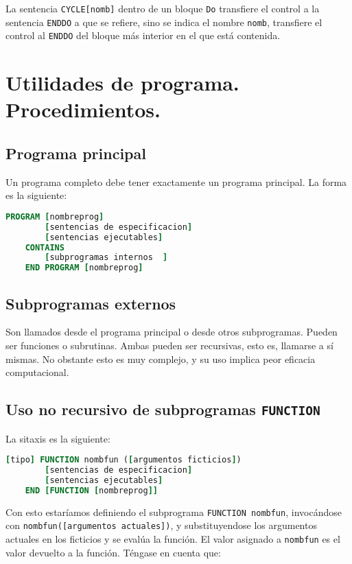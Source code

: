 La sentencia {\tt CYCLE[nomb]} dentro de un bloque {\tt Do} transfiere el control a la sentencia {\tt ENDDO} a que se refiere, sino se indica el nombre {\tt nomb}, transfiere el control al {\tt ENDDO} del bloque más interior en el que está contenida. 


\section{Utilidades de programa. Procedimientos.}

\subsection{Programa principal}

Un programa completo debe tener exactamente un programa principal. La forma es la siguiente:

\begin{lstlisting}[language=Fortran]
	PROGRAM [nombreprog]
		[sentencias de especificacion]
		[sentencias ejecutables]
	CONTAINS
		[subprogramas internos	]
	END PROGRAM [nombreprog]	
\end{lstlisting}

\subsection{Subprogramas externos}

Son llamados desde el programa principal o desde otros subprogramas. Pueden ser funciones o subrutinas. Ambas pueden ser recursivas, esto es, llamarse a sí mismas. No obstante esto es muy complejo, y su uso implica peor eficacia computacional. 

\subsection{Uso no recursivo de subprogramas {\tt FUNCTION}}

La sitaxis es la siguiente:

\begin{lstlisting}[language=Fortran]
	[tipo] FUNCTION nombfun ([argumentos ficticios])
		[sentencias de especificacion]
		[sentencias ejecutables]
	END [FUNCTION [nombreprog]]
\end{lstlisting}

Con esto estaríamos definiendo el subprograma {\tt FUNCTION nombfun}, invocándose con {\tt nombfun([argumentos actuales])}, y substituyendose los argumentos actuales en los ficticios y se evalúa la función. El valor asignado a {\tt nombfun} es el valor devuelto a la función. Téngase en cuenta que:

